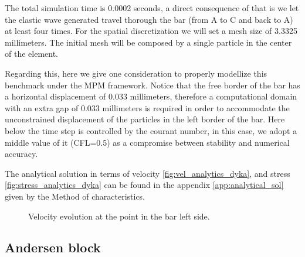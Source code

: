 The total simulation time is 0.0002 seconds, a direct consequence of
that is we let the elastic wave generated travel thorough the bar
(from A to C and back to A) at least four times. For the spatial
discretization we will set a mesh size of 3.3325 millimeters. The
initial mesh will be composed by a single particle in the center of
the element.

Regarding this, here we give one consideration to properly modellize
this benchmark under the MPM framework. Notice that the free border of
the bar has a horizontal displacement of 0.033 millimeters, therefore
a computational domain with an extra gap of 0.033 millimeters is
required in order to accommodate the unconstrained displacement of the
particles in the left border of the bar. Here below the time step is
controlled by the courant number, in this case, we adopt a middle
value of it (CFL=0.5) as a compromise between stability and numerical
accuracy.  

The analytical solution in terms of velocity
\ref{fig:vel_analytics_dyka}, and stress
\ref{fig:stress_analytics_dyka} can be found in the appendix
\ref{app:analytical_sol} given by the Method of characteristics.

\begin{figure}\sidecaption
  \centering
  \caption{Velocity evolution at the point in the bar left side.}
  \label{fig:Dyka-PCE-FE}
\end{figure}

\subsection{Andersen block}
\label{sec:andersen-block}

